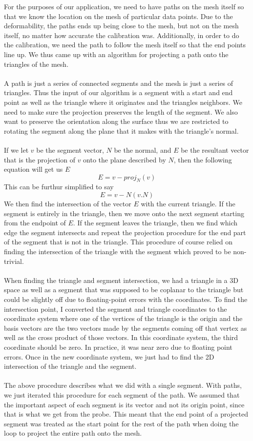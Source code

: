 \documentclass[11pt,psfig]{article}
\begin{document}
For the purposes of our application, we need to have paths on the mesh itself so that we know the location on the mesh of particular data points. Due to the deformability, the paths ends up being close to the mesh, but not on the mesh itself, no matter how accurate the calibration was. Additionally, in order to do the calibration, we need the path to follow the mesh itself so that the end points line up. We thus came up with an algorithm for projecting a path onto the triangles of the mesh. \\
\\
A path is just a series of connected segments and the mesh is just a series of triangles. Thus the input of our algorithm is a segment with a start and end point as well as the triangle where it originates and the triangles neighbors. We need to make sure the projection preserves the length of the segment. We also want to preserve the orientation along the surface thus we are restricted to rotating the segment along the plane that it makes with the triangle's normal. \\
\\
If we let $v$ be the segment vector, $N$ be the normal, and $E$ be the resultant vector that is the projection of $v$ onto the plane described by $N$, then the following equation will get us $E$
\[
E = v - proj_N(v)
\]
This can be furthur simplified to say
\[
E = v - N(v.N)
\]
We then find the intersection of the vector $E$ with the current triangle. If the segment is entirely in the triangle, then we move onto the next segment starting from the endpoint of $E$. If the segment leaves the triangle, then we find which edge the segment intersects and repeat the projection procedure for the end part of the segment that is not in the triangle. This procedure of course relied on finding the intersection of the triangle with the segment which proved to be non-trivial.\\
\\
When finding the triangle and segment intersection, we had a triangle in a 3D space as well as a segment that was supposed to be coplanar to the triangle but could be slightly off due to floating-point errors with the coordinates. To find the intersection point, I converted the segment and triangle coordinates to the coordinate system where one of the vertices of the triangle is the origin and the basis vectors are the two vectors made by the segments coming off that vertex as well as the cross product of those vectors. In this coordinate system, the third coordinate should be zero. In practice, it was near zero due to floating point errors. Once in the new coordinate system, we just had to find the 2D intersection of the triangle and the segment. \\
\\
The above procedure describes what we did with a single segment. With paths, we just iterated this procedure for each segment of the path. We assumed that the important aspect of each segment is its vector and not its origin point, since that is what we get from the probe. This meant that the end point of a projected segment was treated as the start point for the rest of the path when doing the loop to project the entire path onto the mesh.
\end{document}

